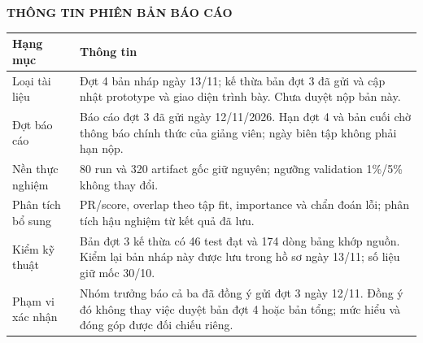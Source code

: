 \documentclass[12pt,a4paper,oneside]{report}
\begin{document}
\thispagestyle{empty}
\vspace*{-1.05cm}
\begin{center}{\bfseries\fontsize{16pt}{20pt}\selectfont\color{HCMUTEDark} THÔNG TIN PHIÊN BẢN BÁO CÁO}\end{center}
\vspace{0.25cm}
\begingroup\fontsize{10.5pt}{13pt}\selectfont\renewcommand{\arraystretch}{1.5}
\begin{tabularx}{\textwidth}{L{4.2cm}Y}\toprule
\textbf{Hạng mục} & \textbf{Thông tin}\\\midrule
Loại tài liệu & Đợt 4 bản nháp ngày 13/11; kế thừa bản đợt 3 đã gửi và cập nhật prototype và giao diện trình bày. Chưa duyệt nộp bản này.\\
Đợt báo cáo & Báo cáo đợt 3 đã gửi ngày 12/11/2026. Hạn đợt 4 và bản cuối chờ thông báo chính thức của giảng viên; ngày biên tập không phải hạn nộp.\\
Nền thực nghiệm & 80 run và 320 artifact gốc giữ nguyên; ngưỡng validation 1\%/5\% không thay đổi.\\
Phân tích bổ sung & PR/score, overlap theo tập fit, importance và chẩn đoán lỗi; phân tích hậu nghiệm từ kết quả đã lưu.\\
Kiểm kỹ thuật & Bản đợt 3 kế thừa có 46 test đạt và 174 dòng bảng khớp nguồn. Kiểm lại bản nháp này được lưu trong hồ sơ ngày 13/11; số liệu giữ mốc 30/10.\\
Phạm vi xác nhận & Nhóm trưởng báo cả ba đã đồng ý gửi đợt 3 ngày 12/11. Đồng ý đó không thay việc duyệt bản đợt 4 hoặc bản tổng; mức hiểu và đóng góp được đối chiếu riêng.\\
\bottomrule\end{tabularx}\endgroup
\vspace{0.35cm}
\par
\clearpage
{}
\setcounter{page}{1}
\begingroup\fontsize{10pt}{12pt}\selectfont{}\tableofcontents\endgroup
\clearpage
{}
\begingroup\fontsize{10pt}{12pt}\selectfont{}
\par\vspace{0.45cm}
\makeatletter{}\makeatother
\endgroup\clearpage
{}
\begingroup\fontsize{10pt}{12pt}\selectfont{}
\par\vspace{0.45cm}
\makeatletter{}\makeatother
\endgroup\clearpage
\end{document}
